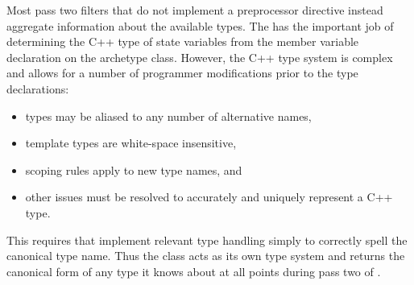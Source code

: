 Most pass two filters that do not implement a preprocessor directive instead
aggregate information about the available types. The  has
the important job of determining the C++ type of state variables from the 
member variable declaration on the archetype class. However, the C++ type system 
is complex and allows for a number of programmer modifications prior 
to the type declarations:
\begin{itemize}
    \item types may be aliased to any number of alternative names, 
    \item template types are white-space insensitive, 
    \item scoping rules apply to new type names, and 
    \item other issues must be resolved to accurately and uniquely represent a C++ type. 
\end{itemize}
This requires that \cycpp implement relevant type handling
simply to correctly spell the canonical type name. 
Thus the  class acts as its own type system and
returns the canonical form of any type it knows about at all points during 
pass two of \cycpp.

